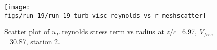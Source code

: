 \begin{figure}[H]
\centering
\texttt{[image: figs/run\_19/run\_19\_turb\_visc\_reynolds\_vs\_r\_meshscatter]}
\caption{Scatter plot of $
u_T$ reynolds stress term vs radius at $z/c$=6.97, $V_{free}$=30.87, station 2.}
\label{fig:run_19_turb_visc_reynolds_vs_r_meshscatter}
\end{figure}


